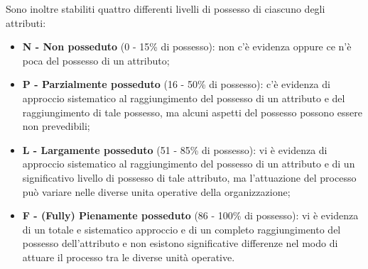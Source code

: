 Sono inoltre stabiliti quattro differenti livelli di possesso di ciascuno degli attributi:\\
\begin{itemize}
\item \textbf{N - Non posseduto} (0 - 15\% di possesso): non c’è evidenza oppure ce n’è poca del possesso di un attributo;
\item \textbf{P - Parzialmente posseduto} (16 - 50\% di possesso): c’è evidenza di approccio sistematico al raggiungimento del possesso di un attributo e del raggiungimento di tale possesso, ma alcuni aspetti del possesso possono essere non prevedibili;
\item \textbf{L - Largamente posseduto} (51 - 85\% di possesso): vi è evidenza di approccio sistematico al raggiungimento del possesso di un attributo e di un significativo livello di possesso di tale attributo, ma l’attuazione del processo può variare nelle diverse unita operative della organizzazione;
\item \textbf{F - (Fully) Pienamente posseduto} (86 - 100\% di possesso): vi è evidenza di un totale e sistematico approccio e di un completo raggiungimento del possesso dell’attributo e non esistono significative differenze nel modo di attuare il processo tra le diverse unità operative.
\end{itemize}

